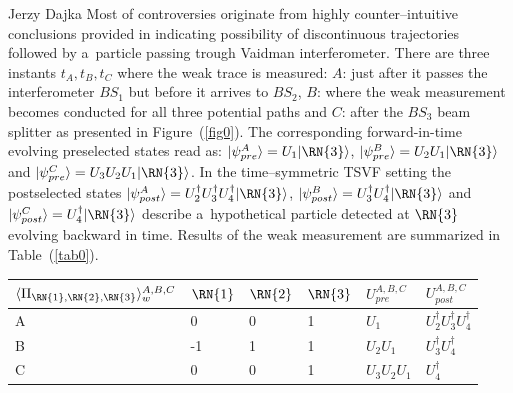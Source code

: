 \begin{artengenv}{Jerzy Dajka}
Most of controversies originate from highly counter--intuitive conclusions provided in \parencite{PhysRevA.87.052104} indicating possibility of discontinuous trajectories followed by a~particle passing trough Vaidman interferometer. There are three instants $t_A,t_B,t_C$ where the weak trace is measured: $A$: just after it passes the interferometer  $BS_1$ but before it arrives to $BS_2$, $B$: where the weak measurement becomes conducted for all three potential paths and $C$: after the $BS_3$ beam splitter as presented in Figure~(\ref{fig0}). The corresponding  forward-in-time evolving preselected states read as:   
$
|\psi_{pre}^A\rangle = U_1|\RN{3}\rangle$, $
|\psi_{pre}^B\rangle = U_2U_1|\RN{3}\rangle$ and $|\psi_{pre}^C\rangle = U_3U_2U_1|\RN{3}\rangle$. 
In the time--symmetric TSVF setting the  postselected states 
$|\psi_{post}^A\rangle = U^\dagger_2U^\dagger_3U^\dagger_4|\RN{3}\rangle$, $|\psi_{post}^B\rangle =U^\dagger_3U^\dagger_4|\RN{3}\rangle$ and $|\psi_{post}^C\rangle =U^\dagger_4|\RN{3}\rangle$ describe a~hypothetical particle detected at $\RN{3}$ evolving backward in time. Results of the weak measurement are summarized in Table~(\ref{tab0}). 
%
\begin{table}[ht]
\centering
\begin{tabular}{|l||lll|ll|}
\hline
$\langle\Pi_{\RN{1},\RN{2},\RN{3}}\rangle_w^{A,B,C}$ & $\RN{1}$ & $\RN{2}$ & $\RN{3}$ &$U_{pre}^{A,B,C}$ & $U_{post}^{A,B,C}$ \\
\hline
\hline
A~& 0 & 0 & 1 & $U_1$ & $U^\dagger_2U^\dagger_3U^\dagger_4$\\
B~& -1 & 1 & 1 & $U_2U_1$ & $U^\dagger_3U^\dagger_4$ \\
C~&  0 & 0 & 1 & $U_3U_2U_1$ & $U^\dagger_4$\\
\hline


\end{tabular}
\end{table}
\end{artengenv}
